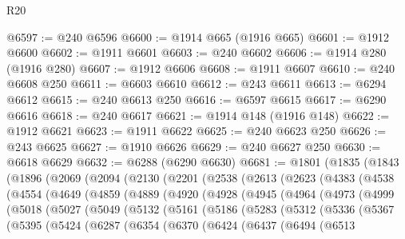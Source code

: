 \begin{lexlean}{R20}
\begin{coremodule}
{@6597 := @240 @6596
@6600 := @1914 @665 (@1916 @665)
@6601 := @1912 @6600
@6602 := @1911 @6601
@6603 := @240 @6602
@6606 := @1914 @280 (@1916 @280)
@6607 := @1912 @6606
@6608 := @1911 @6607
@6610 := @240 @6608 @250
@6611 := @6603 @6610
@6612 := @243 @6611
@6613 := @6294 @6612
@6615 := @240 @6613 @250
@6616 := @6597 @6615
@6617 := @6290 @6616
@6618 := @240 @6617
@6621 := @1914 @148 (@1916 @148)
@6622 := @1912 @6621
@6623 := @1911 @6622
@6625 := @240 @6623 @250
@6626 := @243 @6625
@6627 := @1910 @6626
@6629 := @240 @6627 @250
@6630 := @6618 @6629
@6632 := @6288 (@6290 @6630)
@6681 := @1801
    (@1835
      (@1843
        (@1896
          (@2069
            (@2094
              (@2130
                (@2201
                  (@2538
                    (@2613
                      (@2623
                        (@4383
                          (@4538
                            (@4554
                              (@4649
                                (@4859
                                  (@4889
                                    (@4920
                                      (@4928
                                        (@4945
                                          (@4964
                                            (@4973
                                              (@4999
                                                (@5018
                                                  (@5027
                                                    (@5049
                                                      (@5132
                                                        (@5161
                                                          (@5186
                                                            (@5283
                                                              (@5312
                                                                (@5336
                                                                  (@5367
                                                                    (@5395
                                                                      (@5424
                                                                        (@6287
                                                                          (@6354
                                                                            (@6370
                                                                              (@6424
                                                                                (@6437
                                                                                  (@6494
                                                                                    (@6513
}
\end{coremodule}
\end{lexlean}
